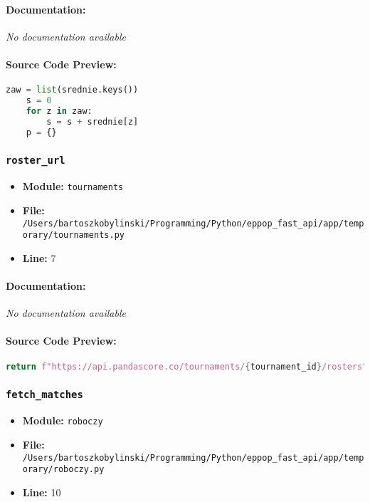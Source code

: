 \documentclass[11pt,a4paper]{article}
\begin{document}
\paragraph{Documentation:} \textit{No documentation available}

\paragraph{Source Code Preview:}
\begin{lstlisting}[language=Python]
    zaw = list(srednie.keys())
    s = 0
    for z in zaw:
        s = s + srednie[z]
    p = {}
\end{lstlisting}

\vspace{1em}
\subsubsection{\texttt{roster\_url}}

\begin{itemize}
    \item \textbf{Module:} \texttt{tournaments}
    \item \textbf{File:} \texttt{/Users/bartoszkobylinski/Programming/Python/eppop\_fast\_api/app/temporary/tournaments.py}
    \item \textbf{Line:} 7
\end{itemize}

\paragraph{Documentation:} \textit{No documentation available}

\paragraph{Source Code Preview:}
\begin{lstlisting}[language=Python]
    return f"https://api.pandascore.co/tournaments/{tournament_id}/rosters"
\end{lstlisting}

\vspace{1em}
\subsubsection{\texttt{fetch\_matches}}

\begin{itemize}
    \item \textbf{Module:} \texttt{roboczy}
    \item \textbf{File:} \texttt{/Users/bartoszkobylinski/Programming/Python/eppop\_fast\_api/app/temporary/roboczy.py}
    \item \textbf{Line:} 10
\end{itemize}
\end{document}
